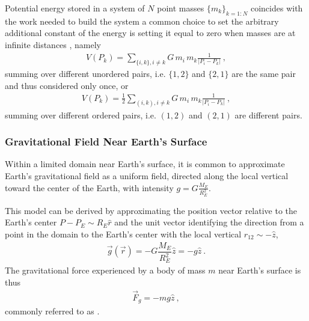 \documentclass[letterpaper,10pt,english]{jupyterBook}
\begin{document}
\sphinxAtStartPar
Potential energy stored in a system of \(N\) point masses \(\{ m_k \}_{k=1:N}\) coincides with the work needed to build the system \sphinxhyphen{} a common choice to set the arbitrary additional constant of the energy is setting it equal to zero when masses are at infinite distances \sphinxhyphen{}, namely
\begin{equation*}
\begin{split}V(P_k) = \sum_{\{i,k\}, i \ne k} G \, m_i \, m_k \frac{1}{|P_i - P_k|} \ ,\end{split}
\end{equation*}
\sphinxAtStartPar
summing over different unordered pairs, i.e. \(\{ 1, 2 \}\) and \(\{2,1\}\) are the same pair and thus considered only once, or
\begin{equation*}
\begin{split}V(P_k) = \frac{1}{2} \sum_{(i,k),  i\ne k} G \, m_i \, m_k \frac{1}{|P_i - P_k|} \ ,\end{split}
\end{equation*}
\sphinxAtStartPar
summing over different ordered pairs, i.e. \((1,2)\) and \((2,1)\) are different pairs.


\subsubsection{Gravitational Field Near Earth’s Surface}
\label{\detokenize{ch/actions-examples:gravitational-field-near-earth-s-surface}}
\sphinxAtStartPar
Within a limited domain near Earth’s surface, it is common to approximate Earth’s gravitational field as a uniform field, directed along the local vertical toward the center of the Earth, with intensity \(g = G \frac{M_E}{R_E^2}\).

\sphinxAtStartPar
This model can be derived by approximating the position vector relative to the Earth’s center \(P - P_E \sim R_E \hat{r}\) and the unit vector identifying the direction from a point in the domain to the Earth’s center with the local vertical \(\hat{r}_{12} \sim - \hat{z}\),
\begin{equation*}
\begin{split}\vec{g}(\vec{r}) = - G \dfrac{M_E}{R_E^2} \hat{z} = - g \hat{z} \ .\end{split}
\end{equation*}
\sphinxAtStartPar
The gravitational force experienced by a body of mass \(m\) near Earth’s surface is thus
\begin{equation*}
\begin{split}\vec{F}_g = - m g \hat{z} \ ,\end{split}
\end{equation*}
\sphinxAtStartPar
commonly referred to as .
\end{document}
